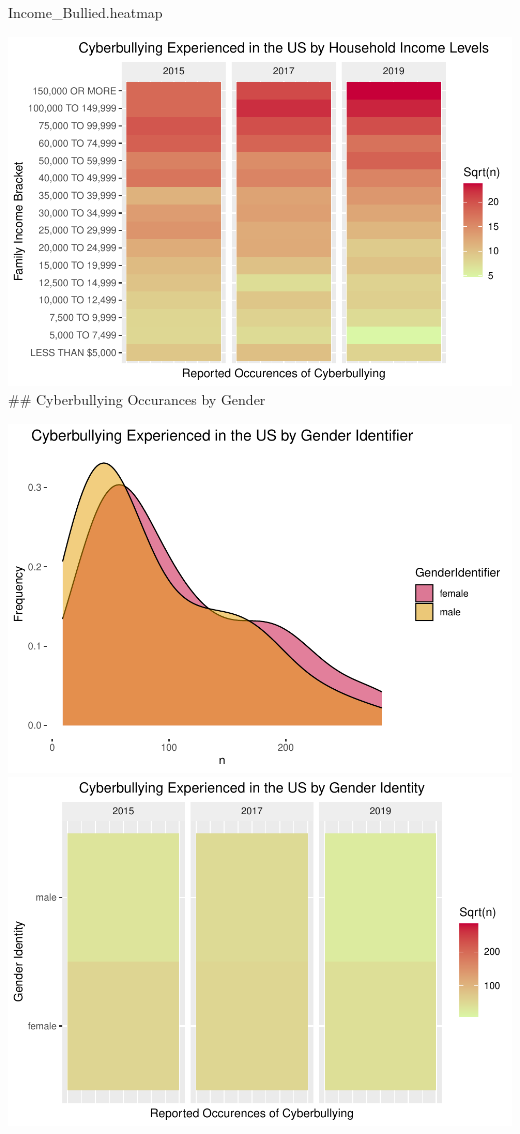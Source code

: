 \documentclass[
  man,LLO-8200, Introduction to Data Science]{apa6}
\newenvironment{Shaded}{\begin{snugshade}}{\end{snugshade}}
\newcommand{\NormalTok}[1]{#1}
\begin{document}
\begin{Shaded}
\begin{Highlighting}[]
\NormalTok{Income\_Bullied.heatmap}
\end{Highlighting}
\end{Shaded}

\includegraphics{CyberBully_files/figure-latex/CyberbullyByIncome-1.pdf}
\#\# Cyberbullying Occurances by Gender

\includegraphics{CyberBully_files/figure-latex/unnamed-chunk-1-1.pdf} \includegraphics{CyberBully_files/figure-latex/unnamed-chunk-1-2.pdf}
\end{document}
